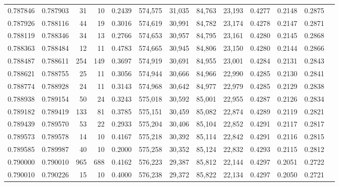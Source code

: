 \begin{tabular}{rrrrrrrrrrrrr}
0.787846 & 0.787903 &    31 &  10 &                                     0.2439 & 574,575 &  31,035 &  84,763 &  23,193 & 0.4277 & 0.2148 & 0.2875 \\
0.787926 & 0.788116 &    44 &  19 &                                     0.3016 & 574,619 &  30,991 &  84,782 &  23,174 & 0.4278 & 0.2147 & 0.2871 \\
0.788119 & 0.788346 &    34 &  13 &                                     0.2766 & 574,653 &  30,957 &  84,795 &  23,161 & 0.4280 & 0.2145 & 0.2868 \\
0.788363 & 0.788484 &    12 &  11 &                                     0.4783 & 574,665 &  30,945 &  84,806 &  23,150 & 0.4280 & 0.2144 & 0.2866 \\
0.788487 & 0.788611 &   254 & 149 &                                     0.3697 & 574,919 &  30,691 &  84,955 &  23,001 & 0.4284 & 0.2131 & 0.2843 \\
0.788621 & 0.788755 &    25 &  11 &                                     0.3056 & 574,944 &  30,666 &  84,966 &  22,990 & 0.4285 & 0.2130 & 0.2841 \\
0.788774 & 0.788928 &    24 &  11 &                                     0.3143 & 574,968 &  30,642 &  84,977 &  22,979 & 0.4285 & 0.2129 & 0.2838 \\
0.788938 & 0.789154 &    50 &  24 &                                     0.3243 & 575,018 &  30,592 &  85,001 &  22,955 & 0.4287 & 0.2126 & 0.2834 \\
0.789182 & 0.789419 &   133 &  81 &                                     0.3785 & 575,151 &  30,459 &  85,082 &  22,874 & 0.4289 & 0.2119 & 0.2821 \\
0.789439 & 0.789570 &    53 &  22 &                                     0.2933 & 575,204 &  30,406 &  85,104 &  22,852 & 0.4291 & 0.2117 & 0.2817 \\
0.789573 & 0.789578 &    14 &  10 &                                     0.4167 & 575,218 &  30,392 &  85,114 &  22,842 & 0.4291 & 0.2116 & 0.2815 \\
0.789585 & 0.789987 &    40 &  10 &                                     0.2000 & 575,258 &  30,352 &  85,124 &  22,832 & 0.4293 & 0.2115 & 0.2812 \\
0.790000 & 0.790010 &   965 & 688 &                                     0.4162 & 576,223 &  29,387 &  85,812 &  22,144 & 0.4297 & 0.2051 & 0.2722 \\
0.790010 & 0.790226 &    15 &  10 &                                     0.4000 & 576,238 &  29,372 &  85,822 &  22,134 & 0.4297 & 0.2050 & 0.2721 \\

\end{tabular}

